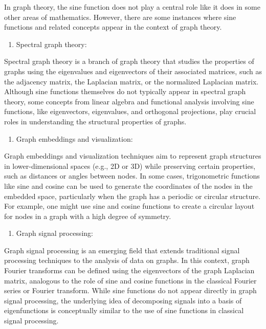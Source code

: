 \documentclass[
]{article}
\providecommand{\tightlist}{%
  \setlength{\itemsep}{0pt}\setlength{\parskip}{0pt}}
\begin{document}
In graph theory, the sine function does not play a central role like it
does in some other areas of mathematics. However, there are some
instances where sine functions and related concepts appear in the
context of graph theory.

\begin{enumerate}
\def\labelenumi{\arabic{enumi}.}
\tightlist
\item
  Spectral graph theory:
\end{enumerate}

Spectral graph theory is a branch of graph theory that studies the
properties of graphs using the eigenvalues and eigenvectors of their
associated matrices, such as the adjacency matrix, the Laplacian matrix,
or the normalized Laplacian matrix. Although sine functions themselves
do not typically appear in spectral graph theory, some concepts from
linear algebra and functional analysis involving sine functions, like
eigenvectors, eigenvalues, and orthogonal projections, play crucial
roles in understanding the structural properties of graphs.

\begin{enumerate}
\def\labelenumi{\arabic{enumi}.}
\setcounter{enumi}{1}
\tightlist
\item
  Graph embeddings and visualization:
\end{enumerate}

Graph embeddings and visualization techniques aim to represent graph
structures in lower-dimensional spaces (e.g., 2D or 3D) while preserving
certain properties, such as distances or angles between nodes. In some
cases, trigonometric functions like sine and cosine can be used to
generate the coordinates of the nodes in the embedded space,
particularly when the graph has a periodic or circular structure. For
example, one might use sine and cosine functions to create a circular
layout for nodes in a graph with a high degree of symmetry.

\begin{enumerate}
\def\labelenumi{\arabic{enumi}.}
\setcounter{enumi}{2}
\tightlist
\item
  Graph signal processing:
\end{enumerate}

Graph signal processing is an emerging field that extends traditional
signal processing techniques to the analysis of data on graphs. In this
context, graph Fourier transforms can be defined using the eigenvectors
of the graph Laplacian matrix, analogous to the role of sine and cosine
functions in the classical Fourier series or Fourier transform. While
sine functions do not appear directly in graph signal processing, the
underlying idea of decomposing signals into a basis of eigenfunctions is
conceptually similar to the use of sine functions in classical signal
processing.
\end{document}
